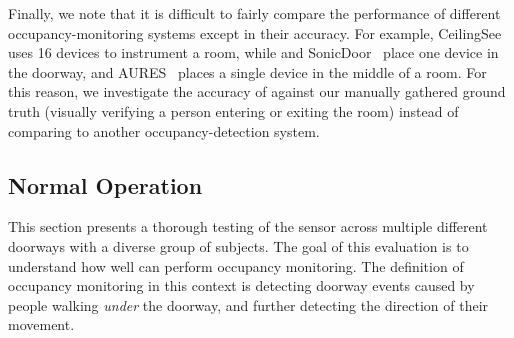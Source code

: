 Finally, we note that it is difficult to fairly compare the performance of different occupancy-monitoring systems except in their accuracy. For example, CeilingSee~\cite{yang2017ceilingsee} uses 16 devices to instrument a room, while \sysname and SonicDoor~\cite{sonicdoor-buildsys2017} place one device in the doorway, and AURES~\cite{shih2016aures} places a single device in the middle of a room. 
For this reason, we investigate the accuracy of \sysname against our manually gathered ground truth (visually verifying a person entering or exiting the room) instead of comparing to another occupancy-detection system.





\subsection{Normal Operation}
\label{sec:normal_operation}

This section presents a thorough testing of the \sysname sensor across multiple different doorways with a diverse group of subjects.
The goal of this evaluation is to understand how well \sysname can perform occupancy monitoring.
The definition of occupancy monitoring in this context is detecting doorway events caused by people walking \textit{under} the doorway, and further detecting the direction of their movement.

